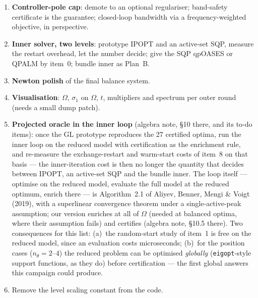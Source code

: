 \documentclass[11pt,a4paper]{article}
\newcommand{\code}[1]{\texttt{#1}}
\newcommand{\reve}[1]{#1}
\newcommand{\revf}[1]{{\color{revf}#1}}
\begin{document}
\begin{enumerate}[leftmargin=1.8em,itemsep=1pt,start=0]
bit for bit (same replay for the algebra note's parallel winding certificate).
\item \textbf{Controller-pole cap}: demote to an optional regulariser; band-safety
certificate is the guarantee; closed-loop bandwidth via a frequency-weighted objective, in
perspective.
\item \textbf{Inner solver, two levels}: prototype IPOPT and an active-set SQP, measure
the restart overhead, let the number decide; give the SQP qpOASES or QPALM by item~0;
bundle inner as Plan~B.
\item \textbf{Newton polish} of the final balance system.
\item \textbf{Visualisation}: $\Omega$, $\sigma_1$ on $\Omega$, $t$, multipliers and
spectrum per outer round (needs a small dump patch).
\reve{\item \textbf{Projected oracle in the inner loop} (algebra note, \S10
there, and its to-do items): once the GL prototype reproduces the 27 certified optima,
run the inner loop on the reduced model with certification as the enrichment rule, and
re-measure the exchange-restart and warm-start costs of item~8 on that basis --- the
inner-iteration cost is then no longer the quantity that decides between IPOPT, an
active-set SQP and the bundle inner.}
\revf{The loop itself --- optimise on the reduced model, evaluate the full model at the
reduced optimum, enrich there --- is Algorithm~2.1 of Aliyev, Benner, Mengi \& Voigt
(2019), with a superlinear convergence theorem under a single-active-peak assumption;
our version enriches at all of $\Omega$ (needed at balanced optima, where their
assumption fails) and certifies (algebra note, \S10.5 there).  Two consequences for this
list: (a)~the random-start study of item~1 is free on the reduced model, since an
evaluation costs microseconds; (b)~for the position cases ($n_\theta=2$--$4$) the reduced
problem can be optimised \emph{globally} (\code{eigopt}-style support functions, as
they do) before certification --- the first global answers this campaign could
produce.}
\item Remove the level scaling constant from the code.
\end{enumerate}
\end{document}
